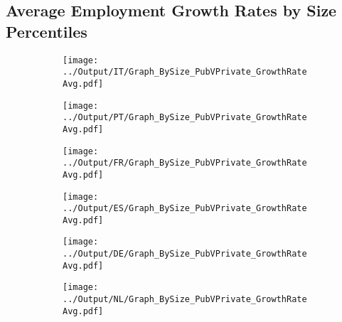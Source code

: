 \documentclass[12pt,notitlepage]{article}
\begin{document}
\subsection{Average Employment Growth Rates by Size Percentiles}
\begin{figure}[!htpb]
\centering
\begin{subfigure}{.49\textwidth}
    \centering
 \texttt{[image: ../Output/IT/Graph\_BySize\_PubVPrivate\_GrowthRateAvg.pdf]}
\end{subfigure}%
\begin{subfigure}{.49\textwidth}
    \centering
 \texttt{[image: ../Output/PT/Graph\_BySize\_PubVPrivate\_GrowthRateAvg.pdf]}
\end{subfigure}
\begin{subfigure}{.49\textwidth}
    \centering
 \texttt{[image: ../Output/FR/Graph\_BySize\_PubVPrivate\_GrowthRateAvg.pdf]}
\end{subfigure}%
\begin{subfigure}{.49\textwidth}
    \centering
 \texttt{[image: ../Output/ES/Graph\_BySize\_PubVPrivate\_GrowthRateAvg.pdf]}
\end{subfigure}
\begin{subfigure}{.49\textwidth}
    \centering
 \texttt{[image: ../Output/DE/Graph\_BySize\_PubVPrivate\_GrowthRateAvg.pdf]}
\end{subfigure}
\begin{subfigure}{.49\textwidth}
    \centering
 \texttt{[image: ../Output/NL/Graph\_BySize\_PubVPrivate\_GrowthRateAvg.pdf]}
\end{subfigure}
\end{figure}
\end{document}
